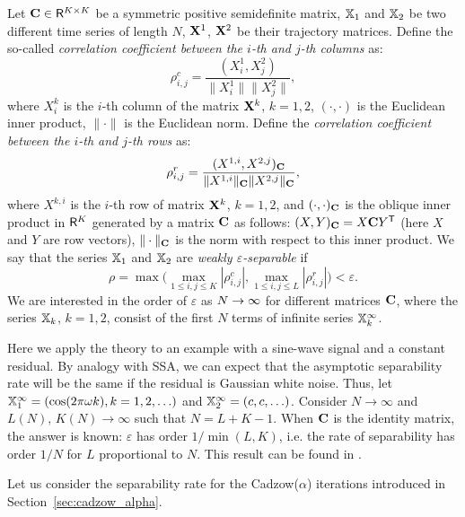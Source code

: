 \documentclass[sii]{ipart}
\begin{document}
Let $\mathbf{C} \in \mathsf{R}^{K \times K}$ be a symmetric positive semidefinite matrix, $\mathbb{X}_1$ and $\mathbb{X}_2$ be two different time series of length $N$, $\mathbf{X}^1$, $\mathbf{X}^2$ be their trajectory matrices. Define the so-called \emph{correlation coefficient between the $i$-th and $j$-th columns} as:
\begin{equation}\label{col_corr}
\rho^c_{i,j} = \frac{(X^1_i, X^2_j)}{\|X^1_i\| \|X^2_j\|},
\end{equation}
where $X^k_i$ is the $i$-th column of the matrix $\mathbf{X}^k$, $k = 1, 2$, $(\cdot, \cdot)$ is the Euclidean inner product, $\|\cdot\|$ is the Euclidean norm. Define the \emph{correlation coefficient between the $i$-th and $j$-th rows} as:
\begin{equation}\label{row_corr}
\rho^r_{i,j} = \frac{(X^{1,i}, X^{2,j})_\bfC}{\|X^{1,i}\|_\bfC \|X^{2,j}\|_\bfC},
\end{equation}
where $X^{k,i}$ is the $i$-th row of matrix $\mathbf{X}^k$, $k = 1, 2$, and $(\cdot, \cdot)_{\mathbf{C}}$ is the oblique inner product in $\mathsf{R}^K$ generated by a matrix $\mathbf{C}$ as follows: $(X, Y)_{\mathbf{C}} = X \mathbf{C} Y^{\mathsf{T}}$ (here $X$ and $Y$ are row vectors), $\|\cdot \|_{\mathbf{C}}$ is the norm with respect to this inner product. We say that the series $\mathbb{X}_1$ and $\mathbb{X}_2$ are \emph{weakly $\varepsilon$-separable} if
\begin{equation}\label{weak_sep_eq}
\rho = \max\Big(\max_{1 \le i,j \le K}|\rho^c_{i,j}|, \max_{1 \le i,j \le L}|\rho^r_{i,j}|\Big) < \varepsilon.
\end{equation}
We are interested in the order of $\varepsilon$ as $N\rightarrow \infty$ for different matrices $\mathbf{C}$, where the series $\mathbb{X}_k$, $k=1,2$, consist of the first $N$ terms of infinite series $\mathbb{X}_k^\infty$.

Here we apply the theory to an example with a sine-wave signal and a constant residual. By analogy with SSA, we can expect that the asymptotic separability rate will be the same if the residual is Gaussian white noise.
Thus, let
$\mathbb{X}_1^\infty = (\cos(2 \pi \omega k), k = 1, 2, \ldots)$ and  $\mathbb{X}_2^\infty = (c, c, \ldots)$.
Consider $N \to \infty$ and $L(N),\,K(N) \to \infty$ such that $N = L + K - 1$.
When $\mathbf{C}$ is the identity matrix, the answer is known: $\varepsilon$ has order $1/\min(L,K)$, i.e. the rate of separability has order $1/N$ for $L$ proportional to $N$.
This result can be found in \cite[Section 6.1]{Golyandina.etal2001}.

\smallskip
Let us consider the separability rate for the Cadzow($\alpha$) iterations introduced in Section~\ref{sec:cadzow_alpha}.
\end{document}

